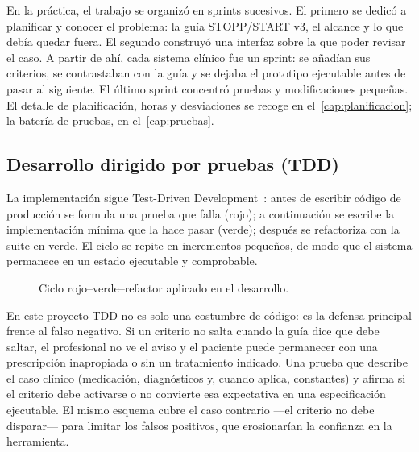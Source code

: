 En la práctica, el trabajo se organizó en sprints sucesivos. El primero
se dedicó a planificar y conocer el problema: la guía STOPP/START v3, el
alcance y lo que debía quedar fuera. El segundo construyó una interfaz
sobre la que poder revisar el caso. A partir de ahí, cada sistema clínico
fue un sprint: se añadían sus criterios, se contrastaban con la guía y se
dejaba el prototipo ejecutable antes de pasar al siguiente. El último
sprint concentró pruebas y modificaciones pequeñas. El detalle de
planificación, horas y desviaciones se recoge en
el~\cref{cap:planificacion}; la batería de pruebas, en
el~\cref{cap:pruebas}.

\subsection{Desarrollo dirigido por pruebas (TDD)}

La implementación sigue Test-Driven Development~\cite{beck2002tdd}:
antes de escribir código de producción se formula una prueba que falla
(rojo); a continuación se escribe la implementación mínima que la hace
pasar (verde); después se refactoriza con la suite en verde. El ciclo se
repite en incrementos pequeños, de modo que el sistema permanece en un
estado ejecutable y comprobable.

\begin{figure}[H]
  \centering
  \caption{Ciclo rojo--verde--refactor aplicado en el desarrollo.}
  \label{fig:ciclo-tdd}
\end{figure}

En este proyecto TDD no es solo una costumbre de código: es la defensa
principal frente al falso negativo. Si un criterio no salta cuando la
guía dice que debe saltar, el profesional no ve el aviso y el paciente
puede permanecer con una prescripción inapropiada o sin un tratamiento
indicado. Una prueba que describe el caso clínico (medicación,
diagnósticos y, cuando aplica, constantes) y afirma si el criterio
debe activarse o no convierte esa expectativa en una especificación
ejecutable. El mismo esquema cubre el caso contrario ---el criterio no
debe disparar--- para limitar los falsos positivos, que erosionarían la
confianza en la herramienta.

